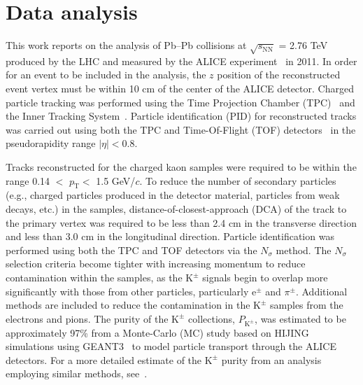 \documentclass{svproc}
\newcommand{\pt}{$p_{\mathrm{T}}$\xspace}
\newcommand{\Kpm}{$\mathrm{K^{\pm}}$\xspace}
\begin{document}
\section{Data analysis}
\label{sec:DataAnalysis}

This work reports on the analysis of Pb--Pb collisions at $\sqrt{s_{\mathrm{NN}}}$ = 2.76 TeV produced by the LHC and measured by the ALICE experiment~\cite{Aamodt:2008zz} in 2011.
In order for an event to be included in the analysis, the $z$ position of the reconstructed event vertex must be within 10 cm of the center of the ALICE detector. 
Charged particle tracking was performed using the Time Projection Chamber (TPC)~\cite{2010NIMPA.622..316A} and the Inner Tracking System~\cite{Abelevetal:2014dna}.  
Particle identification (PID) for reconstructed tracks was carried out using both the TPC and Time-Of-Flight (TOF) detectors~\cite{Abelev:2014ffa,Akindinov:2013tea} in the pseudorapidity range $|\eta| < 0.8$.  

Tracks reconstructed for the charged kaon samples were required to be within the range 0.14 $<$ \pt $<$ 1.5 GeV/$c$.
To reduce the number of secondary particles (e.g., charged particles produced in the detector material, particles from weak decays, etc.) in the samples, distance-of-closest-approach (DCA) of the track to the primary vertex was required to be less than 2.4 cm in the transverse direction and less than 3.0 cm in the longitudinal direction.
Particle identification was performed using both the TPC and TOF detectors via the $N_{\sigma}$ method. 
The $N_{\sigma}$ selection criteria become tighter with increasing momentum to reduce contamination within the samples, as the \Kpm signals begin to overlap more significantly with those from other particles, particularly e$^{\pm}$ and $\pi^{\pm}$.
Additional methods are included to reduce the contamination in the \Kpm samples from the electrons and pions.  
The purity of the \Kpm collections, $P_{\mathrm{K}^{\pm}}$, was estimated to be approximately 97\% from a Monte-Carlo (MC) study based on HIJING~\cite{PhysRevD.44.3501} simulations using GEANT3~\cite{Brun:1082634} to model particle transport through the ALICE detectors. 
For a more detailed estimate of the \Kpm purity from an analysis employing similar methods, see~\cite{Acharya:2017qtq}.
\end{document}
